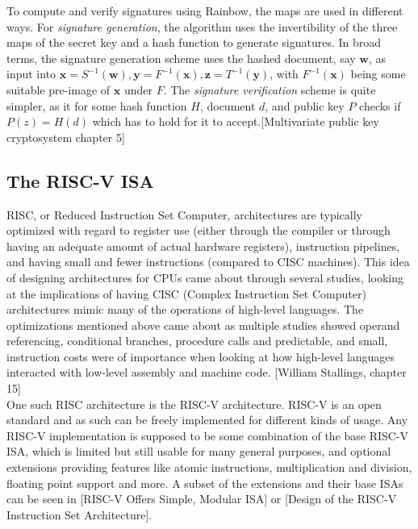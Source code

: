 To compute and verify signatures using Rainbow, the maps are used in different ways.
For \textit{signature generation}, the algorithm uses the invertibility of the three maps of the secret key and a hash function to generate signatures. In broad terms, the signature generation scheme uses the hashed document, say $\mathbf{w}$, as input into $\mathbf{x} = S^{-1}(\mathbf{w}), \mathbf{y} = F^{-1}(\mathbf{x}), \mathbf{z} = T^{-1}(\mathbf{y})$, with $F^{-1}(\mathbf{x})$ being some suitable pre-image of $\mathbf{x}$ under $F$. The \textit{signature verification} scheme is quite simpler, as it for some hash function $H$, document $d$, and public key $P$ checks if $P(z) = H(d)$ which has to hold for it to accept.[Multivariate public key cryptosystem chapter 5]

\subsection{The RISC-V ISA} \label{pre-riscv}
RISC, or Reduced Instruction Set Computer, architectures are typically optimized with regard to register use (either through the compiler or through having an adequate amount of actual hardware registers), instruction pipelines, and having small and fewer instructions (compared to CISC machines). This idea of designing architectures for CPUs came about through several studies, looking at the implications of having CISC (Complex Instruction Set Computer) architectures mimic many of the operations of high-level languages. The optimizations mentioned above came about as multiple studies showed operand referencing, conditional branches, procedure calls and predictable, and small, instruction costs were of importance when looking at how high-level languages interacted with low-level assembly and machine code. [William Stallings, chapter 15] \medskip\\
One such RISC architecture is the RISC-V architecture. RISC-V is an open standard and as such can be freely implemented for different kinds of usage. Any RISC-V implementation is supposed to be some combination of the base RISC-V ISA, which is limited but still usable for many general purposes, and optional extensions providing features like atomic instructions, multiplication and division, floating point support and more. A subset of the extensions and their base ISAs can be seen in [RISC-V Offers Simple, Modular ISA] or [Design of the RISC-V Instruction Set Architecture].
\medskip\\
